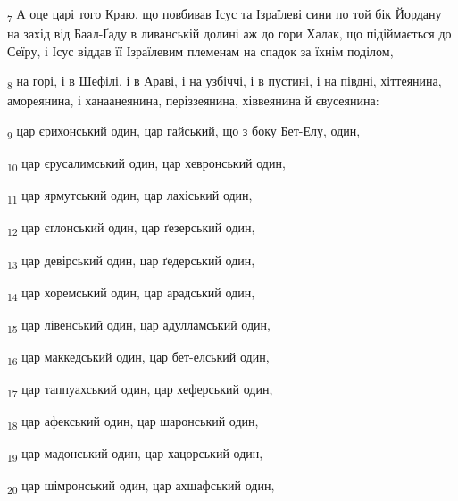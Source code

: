 \begin{tcolorbox}
\textsubscript{7} А оце царі того Краю, що повбивав Ісус та Ізраїлеві сини по той бік Йордану на захід від Баал-Ґаду в ливанській долині аж до гори Халак, що підіймається до Сеїру, і Ісус віддав її Ізраїлевим племенам на спадок за їхнім поділом,
\end{tcolorbox}
\begin{tcolorbox}
\textsubscript{8} на горі, і в Шефілі, і в Араві, і на узбіччі, і в пустині, і на півдні, хіттеянина, амореянина, і ханаанеянина, періззеянина, хіввеянина й євусеянина:
\end{tcolorbox}
\begin{tcolorbox}
\textsubscript{9} цар єрихонський один, цар гайський, що з боку Бет-Елу, один,
\end{tcolorbox}
\begin{tcolorbox}
\textsubscript{10} цар єрусалимський один, цар хевронський один,
\end{tcolorbox}
\begin{tcolorbox}
\textsubscript{11} цар ярмутський один, цар лахіський один,
\end{tcolorbox}
\begin{tcolorbox}
\textsubscript{12} цар єґлонський один, цар ґезерський один,
\end{tcolorbox}
\begin{tcolorbox}
\textsubscript{13} цар девірський один, цар ґедерський один,
\end{tcolorbox}
\begin{tcolorbox}
\textsubscript{14} цар хоремський один, цар арадський один,
\end{tcolorbox}
\begin{tcolorbox}
\textsubscript{15} цар лівенський один, цар адулламський один,
\end{tcolorbox}
\begin{tcolorbox}
\textsubscript{16} цар маккедський один, цар бет-елський один,
\end{tcolorbox}
\begin{tcolorbox}
\textsubscript{17} цар таппуахський один, цар хеферський один,
\end{tcolorbox}
\begin{tcolorbox}
\textsubscript{18} цар афекський один, цар шаронський один,
\end{tcolorbox}
\begin{tcolorbox}
\textsubscript{19} цар мадонський один, цар хацорський один,
\end{tcolorbox}
\begin{tcolorbox}
\textsubscript{20} цар шімронський один, цар ахшафський один,
\end{tcolorbox}
